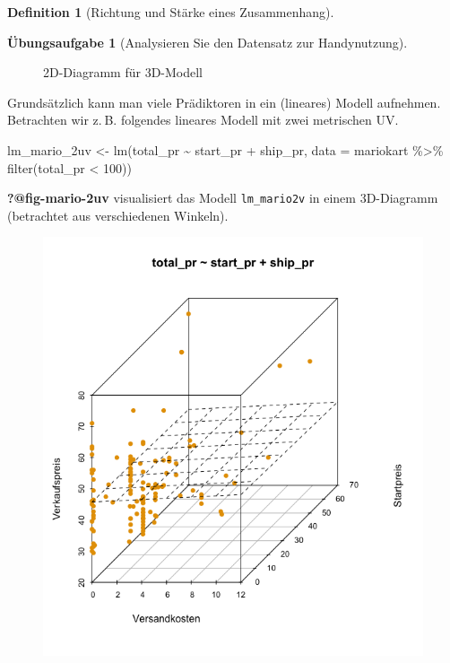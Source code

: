 \documentclass[
  a4paper,
  DIV=11]{scrreprt}
\newenvironment{Shaded}{\begin{snugshade}}{\end{snugshade}}
\newcommand{\AttributeTok}[1]{\textcolor[rgb]{0.40,0.45,0.13}{#1}}
\newcommand{\DecValTok}[1]{\textcolor[rgb]{0.68,0.00,0.00}{#1}}
\newcommand{\FunctionTok}[1]{\textcolor[rgb]{0.28,0.35,0.67}{#1}}
\newcommand{\NormalTok}[1]{\textcolor[rgb]{0.00,0.23,0.31}{#1}}
\newcommand{\OtherTok}[1]{\textcolor[rgb]{0.00,0.23,0.31}{#1}}
\newcommand{\SpecialCharTok}[1]{\textcolor[rgb]{0.37,0.37,0.37}{#1}}
\theoremstyle{definition}
\newtheorem{exercise}{Übungsaufgabe}[chapter]
\theoremstyle{definition}
\theoremstyle{definition}
\newtheorem{definition}{Definition}[chapter]
\theoremstyle{remark}
\begin{document}
\begin{definition}[Richtung und Stärke eines
Zusammenhang]
\begin{exercise}[Analysieren Sie den Datensatz zur
Handynutzung]
\begin{figure}
{}

\caption{\label{fig-3d-regr-2d}2D-Diagramm für 3D-Modell}

\end{figure}%

Grundsätzlich kann man viele Prädiktoren in ein (lineares) Modell
aufnehmen. Betrachten wir z. B. folgendes lineares Modell mit zwei
metrischen UV.

\begin{Shaded}
\begin{Highlighting}[]
\NormalTok{lm\_mario\_2uv }\OtherTok{\textless{}{-}} \FunctionTok{lm}\NormalTok{(total\_pr }\SpecialCharTok{\textasciitilde{}}\NormalTok{ start\_pr }\SpecialCharTok{+}\NormalTok{ ship\_pr, }\AttributeTok{data =}\NormalTok{ mariokart }\SpecialCharTok{\%\textgreater{}\%} \FunctionTok{filter}\NormalTok{(total\_pr }\SpecialCharTok{\textless{}} \DecValTok{100}\NormalTok{))}
\end{Highlighting}
\end{Shaded}

\textbf{?@fig-mario-2uv} visualisiert das Modell \texttt{lm\_mario2v} in
einem 3D-Diagramm (betrachtet aus verschiedenen Winkeln).

\begin{figure}

\begin{minipage}{0.33\linewidth}

\includegraphics{img/3d_scatter_mario1.png}


\end{minipage}
\end{figure}
\end{exercise}
\end{definition}
\end{document}
